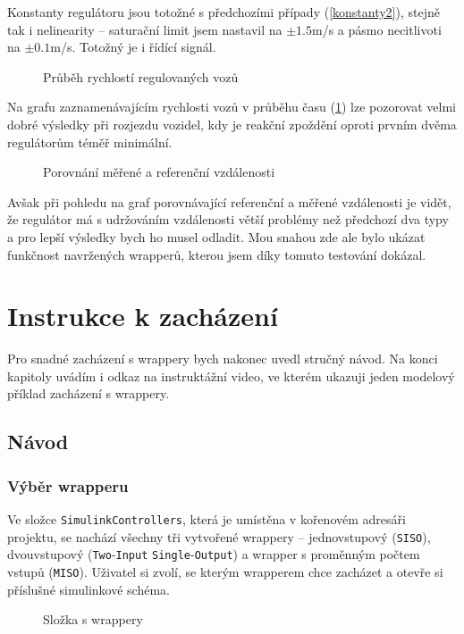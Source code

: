 \documentclass[thesis=M,czech,hidelinks]{FITthesis}[2012/06/26]
\begin{document}
Konstanty regulátoru jsou totožné s předchozími případy (\ref{konstanty2}), stejně tak i nelinearity – saturační limit jsem nastavil na $\pm1.5$m/s a pásmo necitlivoti na $\pm0.1$m/s. Totožný je i řídící signál. 
\begin{figure}[h]
        \centering
        \caption{Průběh rychlostí regulovaných vozů}
        \label{fig:leadV}
\end{figure}

Na grafu zaznamenávajícím rychlosti vozů v průběhu času (\ref{fig:leadV}) lze pozorovat velmi dobré výsledky při rozjezdu vozidel, kdy je reakční zpoždění oproti prvním dvěma regulátorům téměř minimální.
\begin{figure}[h]
        \centering
        \caption{Porovnání měřené a referenční vzdálenosti}
        \label{fig:leadD}
\end{figure}

Avšak při pohledu na graf porovnávající referenční a měřené vzdálenosti je vidět, že regulátor má s udržováním vzdálenosti větší problémy než předchozí dva typy a pro lepší výsledky bych ho musel odladit. Mou snahou zde ale bylo ukázat funkčnost navržených wrapperů, kterou jsem díky tomuto testování dokázal.  


\chapter{Instrukce k zacházení}
Pro snadné zacházení s wrappery bych nakonec uvedl stručný návod. Na konci kapitoly uvádím i odkaz na instruktážní video, ve kterém ukazuji jeden modelový příklad zacházení s wrappery.
\section{Návod}
\subsection{Výběr wrapperu}
Ve složce \texttt{SimulinkControllers}, která je umístěna v kořenovém adresáři projektu, se nachází všechny tři vytvořené wrappery – jednovstupový (\texttt{SISO}), dvouvstupový (\texttt{Two}-\texttt{Input} \texttt{Single}-\texttt{Output}) a wrapper s proměnným počtem vstupů (\texttt{MISO}). Uživatel si zvolí, se kterým wrapperem chce zacházet a otevře si příslušné simulinkové schéma.
\begin{figure}[h]
        \centering
        \caption{Složka s wrappery}
        \label{fig:folder}
\end{figure}
\end{document}
